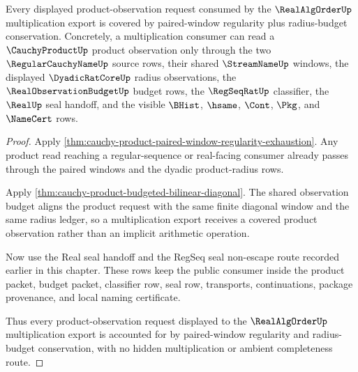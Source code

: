 \begin{theorem}
\label{thm:cauchy-product-shared-radius-product-coverage}
Every displayed product-observation request consumed by the $\RealAlgOrderUp$ multiplication export is covered by paired-window regularity plus radius-budget conservation. Concretely, a multiplication consumer can read a $\CauchyProductUp$ product observation only through the two $\RegularCauchyNameUp$ source rows, their shared $\StreamNameUp$ windows, the displayed $\DyadicRatCoreUp$ radius observations, the $\RealObservationBudgetUp$ budget rows, the $\RegSeqRatUp$ classifier, the $\RealUp$ seal handoff, and the visible $\BHist$, $\hsame$, $\Cont$, $\Pkg$, and $\NameCert$ rows.
\end{theorem}
\begin{proof}
Apply \autoref{thm:cauchy-product-paired-window-regularity-exhaustion}. Any product read reaching a regular-sequence or real-facing consumer already passes through the paired windows and the dyadic product-radius rows.

Apply \autoref{thm:cauchy-product-budgeted-bilinear-diagonal}. The shared observation budget aligns the product request with the same finite diagonal window and the same radius ledger, so a multiplication export receives a covered product observation rather than an implicit arithmetic operation.

Now use the Real seal handoff and the RegSeq seal non-escape route recorded earlier in this chapter. These rows keep the public consumer inside the product packet, budget packet, classifier row, seal row, transports, continuations, package provenance, and local naming certificate.

Thus every product-observation request displayed to the $\RealAlgOrderUp$ multiplication export is accounted for by paired-window regularity and radius-budget conservation, with no hidden multiplication or ambient completeness route.
\end{proof}

